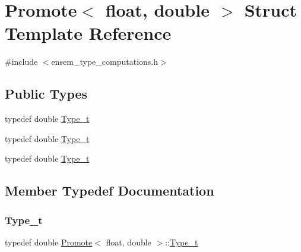 \hypertarget{structPromote_3_01float_00_01double_01_4}{}\section{Promote$<$ float, double $>$ Struct Template Reference}
\label{structPromote_3_01float_00_01double_01_4}


{\ttfamily \#include $<$ensem\+\_\+type\+\_\+computations.\+h$>$}

\subsection*{Public Types}
\begin{DoxyCompactItemize}
\item 
typedef double \mbox{\hyperlink{structPromote_3_01float_00_01double_01_4_a45975d2ae1225ef4f1993d0a48b8a58e}{Type\+\_\+t}}
\item 
typedef double \mbox{\hyperlink{structPromote_3_01float_00_01double_01_4_a45975d2ae1225ef4f1993d0a48b8a58e}{Type\+\_\+t}}
\item 
typedef double \mbox{\hyperlink{structPromote_3_01float_00_01double_01_4_a45975d2ae1225ef4f1993d0a48b8a58e}{Type\+\_\+t}}
\end{DoxyCompactItemize}


\subsection{Member Typedef Documentation}
\mbox{\label{structPromote_3_01float_00_01double_01_4_a45975d2ae1225ef4f1993d0a48b8a58e}} 
\subsubsection{\texorpdfstring{Type\_t}{Type\_t}\hspace{0.1cm}{\footnotesize\ttfamily [1/3]}}
{\footnotesize\ttfamily typedef double \mbox{\hyperlink{structPromote}{Promote}}$<$ float, double $>$\+::\mbox{\hyperlink{structPromote_3_01float_00_01double_01_4_a45975d2ae1225ef4f1993d0a48b8a58e}{Type\+\_\+t}}}

\mbox{\label{structPromote_3_01float_00_01double_01_4_a45975d2ae1225ef4f1993d0a48b8a58e}} 
